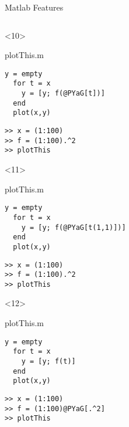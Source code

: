 \begin{frame}[fragile]{Matlab Features}
\begin{columns}
\begin{column}{5cm}
      \begin{onlyenv}<10>
        \begin{block}{plotThis.m}
          \begin{Verbatim}[commandchars=@\[\]]
  y = empty
  for t = x
    y = [y; f(@PYaG[t])]
  end
  plot(x,y)
          \end{Verbatim}
        \end{block}
          \begin{Verbatim}[commandchars=@\[\]]
>> x = (1:100)
>> f = (1:100).^2
>> plotThis
        \end{Verbatim}
      \end{onlyenv}

      \begin{onlyenv}<11>
        \begin{block}{plotThis.m}
          \begin{Verbatim}[commandchars=@\[\]]
  y = empty
  for t = x
    y = [y; f(@PYaG[t(1,1)])]
  end
  plot(x,y)
          \end{Verbatim}
        \end{block}
          \begin{Verbatim}[commandchars=@\[\]]
>> x = (1:100)
>> f = (1:100).^2 
>> plotThis
        \end{Verbatim}
      \end{onlyenv}
      \begin{onlyenv}<12>
        \begin{block}{plotThis.m}
          \begin{Verbatim}[commandchars=@\[\]]
  y = empty
  for t = x
    y = [y; f(t)]
  end
  plot(x,y)
          \end{Verbatim}
        \end{block}
          \begin{Verbatim}[commandchars=@\[\]]
>> x = (1:100)
>> f = (1:100)@PYaG[.^2] 
>> plotThis
        \end{Verbatim}
      \end{onlyenv}

\end{column}
\end{columns}
\end{frame}
